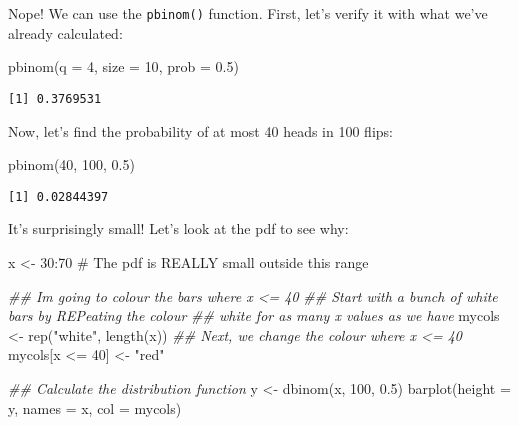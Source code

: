 \documentclass[
  letterpaper,
  DIV=11,
  numbers=noendperiod]{scrreprt}
\newenvironment{Shaded}{\begin{snugshade}}{\end{snugshade}}
\newcommand{\AttributeTok}[1]{\textcolor[rgb]{0.40,0.45,0.13}{#1}}
\newcommand{\CommentTok}[1]{\textcolor[rgb]{0.37,0.37,0.37}{#1}}
\newcommand{\DecValTok}[1]{\textcolor[rgb]{0.68,0.00,0.00}{#1}}
\newcommand{\DocumentationTok}[1]{\textcolor[rgb]{0.37,0.37,0.37}{\textit{#1}}}
\newcommand{\FloatTok}[1]{\textcolor[rgb]{0.68,0.00,0.00}{#1}}
\newcommand{\FunctionTok}[1]{\textcolor[rgb]{0.28,0.35,0.67}{#1}}
\newcommand{\NormalTok}[1]{\textcolor[rgb]{0.00,0.23,0.31}{#1}}
\newcommand{\OtherTok}[1]{\textcolor[rgb]{0.00,0.23,0.31}{#1}}
\newcommand{\SpecialCharTok}[1]{\textcolor[rgb]{0.37,0.37,0.37}{#1}}
\newcommand{\StringTok}[1]{\textcolor[rgb]{0.13,0.47,0.30}{#1}}
\begin{document}
Nope! We can use the \texttt{pbinom()} function. First, let's verify it
with what we've already calculated:

\begin{Shaded}
\begin{Highlighting}[]
\FunctionTok{pbinom}\NormalTok{(}\AttributeTok{q =} \DecValTok{4}\NormalTok{, }\AttributeTok{size =} \DecValTok{10}\NormalTok{, }\AttributeTok{prob =} \FloatTok{0.5}\NormalTok{)}
\end{Highlighting}
\end{Shaded}

\begin{verbatim}
[1] 0.3769531
\end{verbatim}

Now, let's find the probability of at most 40 heads in 100 flips:

\begin{Shaded}
\begin{Highlighting}[]
\FunctionTok{pbinom}\NormalTok{(}\DecValTok{40}\NormalTok{, }\DecValTok{100}\NormalTok{, }\FloatTok{0.5}\NormalTok{)}
\end{Highlighting}
\end{Shaded}

\begin{verbatim}
[1] 0.02844397
\end{verbatim}

It's surprisingly small! Let's look at the pdf to see why:

\begin{Shaded}
\begin{Highlighting}[]
\NormalTok{x }\OtherTok{\textless{}{-}} \DecValTok{30}\SpecialCharTok{:}\DecValTok{70} \CommentTok{\# The pdf is REALLY small outside this range}

\DocumentationTok{\#\# I\textquotesingle{}m going to colour the bars where x \textless{}= 40}
\DocumentationTok{\#\# Start with a bunch of white bars by REPeating the colour}
\DocumentationTok{\#\# white for as many x values as we have}
\NormalTok{mycols }\OtherTok{\textless{}{-}} \FunctionTok{rep}\NormalTok{(}\StringTok{"white"}\NormalTok{, }\FunctionTok{length}\NormalTok{(x))}
\DocumentationTok{\#\# Next, we change the colour where x \textless{}= 40}
\NormalTok{mycols[x }\SpecialCharTok{\textless{}=} \DecValTok{40}\NormalTok{] }\OtherTok{\textless{}{-}} \StringTok{"red"}

\DocumentationTok{\#\# Calculate the distribution function}
\NormalTok{y }\OtherTok{\textless{}{-}} \FunctionTok{dbinom}\NormalTok{(x, }\DecValTok{100}\NormalTok{, }\FloatTok{0.5}\NormalTok{)}
\FunctionTok{barplot}\NormalTok{(}\AttributeTok{height =}\NormalTok{ y, }\AttributeTok{names =}\NormalTok{ x, }\AttributeTok{col =}\NormalTok{ mycols)}
\end{Highlighting}
\end{Shaded}
\end{document}
